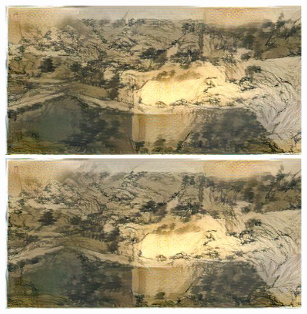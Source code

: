 \documentclass[runningheads]{llncs}
\begin{document}
\begin{figure}[h]
{\begin{minipage}[b]{0.15\textwidth}
\includegraphics[width=1.1\textwidth]{neural_style_transfer/img/fu_stockholm_output/fu_stockholm_conv2-2_1e-3.jpg} \\
\includegraphics[width=1.1\textwidth]{neural_style_transfer/img/fu_stockholm_output/fu_stockholm_conv2-2_1e-4.jpg}
\end{minipage}
}
\end{figure}
\end{document}
